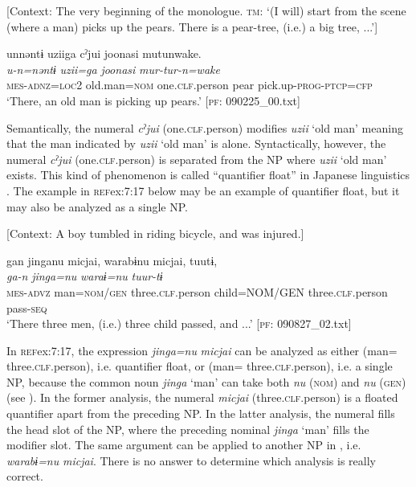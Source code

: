 [Context: The very beginning of the monologue. \textsc{tm}: ‘(I will) start from the scene (where a man) picks up the pears. There is a pear-tree, (i.e.) a big tree, ...’]

{\TM}
\glll unnəntɨ  uziiga  cˀjui  joonasi   mutunwake.\\
\textit{u-n=nəntɨ}  \textit{uzii=ga}  \textit{}  \textit{joonasi} \textit{mur-tur-n=wake}\\
    \textsc{mes}-\textsc{adnz}=\textsc{loc}2  old.man=\textsc{nom}  one.\textsc{clf}.person  pear  pick.up-\textsc{prog}-\textsc{ptcp}=\textsc{cfp}\\
\glt    ‘There, an old man is picking up pears.’ [\textsc{pf}: 090225\_00.txt]

\z

Semantically, the numeral \textit{cˀjui} (one.\textsc{clf}.person) modifies \textit{uzii} ‘old man’ meaning that the man indicated by \textit{uzii} ‘old man’ is alone. Syntactically, however, the numeral \textit{cˀjui} (one.\textsc{clf}.person) is separated from the NP where \textit{uzii} ‘old man’ exists. This kind of phenomenon is called “quantifier float” in Japanese linguistics \citep[286]{Shibatani1990}. The example in \textsc{ref}{ex:7:17} below may be an example of quantifier float, but it may also be analyzed as a single NP.

\ea \label{ex:7:17}  [Context: A boy tumbled in riding bicycle, and was injured.]

{\TM}
\glll gan  jinganu  micjai,  warabɨnu  micjai,  tuutɨ,\\
\textit{ga-n}  \textit{jinga=nu}  \textit{}  \textit{waraɨ=nu} \textit{}  \textit{tuur-tɨ}\\
    \textsc{mes}-\textsc{advz}  man=\textsc{nom}/\textsc{gen}  three.\textsc{clf}.person  child=NOM/GEN   three.\textsc{clf}.person  pass-\textsc{seq}\\
\glt    ‘There three men, (i.e.) three child passed, and ...’ [\textsc{pf}: 090827\_02.txt]

\z

In \textsc{ref}{ex:7:17}, the expression \textit{jinga=nu} \textit{micjai} can be analyzed as either (man= three.\textsc{clf}.person), i.e. quantifier float, or (man= three.\textsc{clf}.person), i.e. a single NP, because the common noun \textit{jinga} ‘man’ can take both \textit{nu} (\textsc{nom}) and \textit{nu} (\textsc{gen}) (see ). In the former analysis, the numeral \textit{micjai} (three.\textsc{clf}.person) is a floated quantifier apart from the preceding NP. In the latter analysis, the numeral fills the head slot of the NP, where the preceding nominal \textit{jinga} ‘man’ fills the modifier slot. The same argument can be applied to another NP in , i.e. \textit{warabɨ=nu} \textit{micjai}. There is no answer to determine which analysis is really correct.

